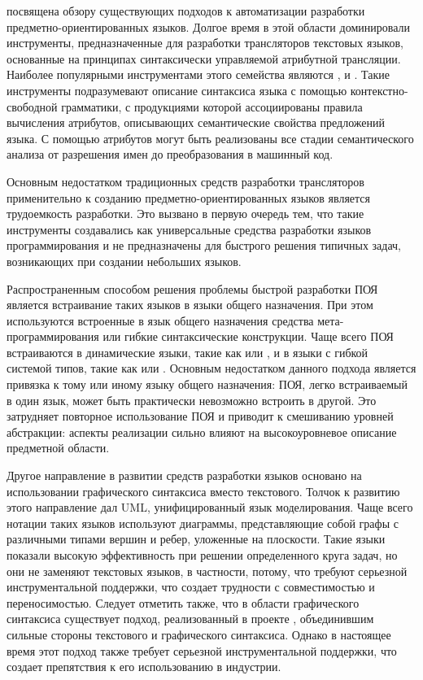  посвящена обзору существующих подходов к автоматизации разработки предметно-ориентированных языков. Долгое время в этой области доминировали инструменты, предназначенные для разработки трансляторов текстовых языков, основанные на принципах синтаксически управляемой атрибутной трансляции. Наиболее популярными инструментами этого семейства являются ,  и . Такие инструменты подразумевают описание синтаксиса языка с помощью контекстно-свободной грамматики, с продукциями которой ассоциированы правила вычисления атрибутов, описывающих семантические свойства предложений языка. С помощью атрибутов могут быть реализованы все стадии семантического анализа от разрешения имен до преобразования в машинный код. 

Основным недостатком традиционных средств разработки трансляторов применительно к созданию предметно-ориентированных языков является трудоемкость разработки. Это вызвано в первую очередь тем, что такие инструменты создавались как универсальные средства разработки языков программирования и не предназначены для быстрого решения типичных задач, возникающих при создании небольших языков.

Распространенным способом решения проблемы быстрой разработки ПОЯ является встраивание таких языков в языки общего назначения. При этом используются встроенные в язык общего назначения средства мета-программирования или гибкие синтаксические конструкции. Чаще всего ПОЯ встраиваются в динамические языки, такие как  или , и в языки с гибкой системой типов, такие как  или . Основным недостатком данного подхода является привязка к тому или иному языку общего назначения: ПОЯ, легко встраиваемый в один язык, может быть практически невозможно встроить в другой. Это затрудняет повторное использование ПОЯ и приводит к смешиванию уровней абстракции: аспекты реализации сильно влияют на высокоуровневое описание предметной области.

Другое направление в развитии средств разработки языков основано на использовании графического синтаксиса вместо текстового. Толчок к развитию этого направление дал UML, унифицированный язык моделирования. Чаще всего нотации таких языков используют диаграммы, представляющие собой графы с различными типами вершин и ребер, уложенные на плоскости. Такие языки показали высокую эффективность при решении определенного круга задач, но они не заменяют текстовых языков, в частности, потому, что требуют серьезной инструментальной поддержки, что создает трудности с совместимостью и переносимостью. Следует отметить также, что в области графического синтаксиса существует подход, реализованный в проекте , объединившим сильные стороны текстового и графического синтаксиса. Однако в настоящее время этот подход также требует серьезной инструментальной поддержки, что создает препятствия к его использованию в индустрии.

